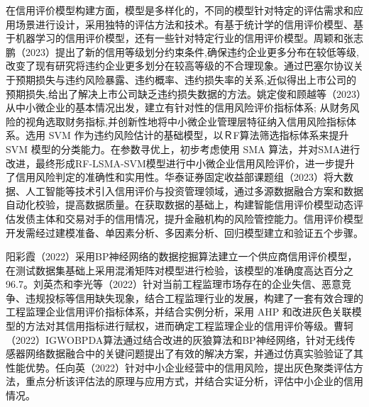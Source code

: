 在信用评价模型构建方面，模型是多样化的，不同的模型针对特定的评估需求和应用场景进行设计，采用独特的评估方法和技术。有基于统计学的信用评价模型、基于机器学习的信用评价模型，还有一些针对特定行业的信用评价模型。周颖和张志鹏（2023）提出了新的信用等级划分约束条件,确保违约企业更多分布在较低等级,改变了现有研究将违约企业更多划分在较高等级的不合理现象。通过巴塞尔协议关于预期损失与违约风险暴露、违约概率、违约损失率的关系,近似得出上市公司的预期损失,给出了解决上市公司缺乏违约损失数据的方法。姚定俊和顾越等（2023）从中小微企业的基本情况出发，建立有针对性的信用风险评价指标体系; 从财务风险的视角选取财务指标,并创新性地将中小微企业管理层特征纳入信用风险指标体系。选用 SVM 作为违约风险估计的基础模型，以ＲF算法筛选指标体系来提升 SVM 模型的分类能力。在参数寻优上，初步考虑使用 SMA 算法，并对SMA进行改进，最终形成RF-LSMA-SVM模型进行中小微企业信用风险评价，进一步提升了信用风险判定的准确性和实用性。华泰证券固定收益部课题组（2023）将大数据、人工智能等技术引入信用评价与投资管理领域，通过多源数据融合方案和数据自动化校验，提高数据质量。在获取数据的基础上，构建智能信用评价模型动态评估发债主体和交易对手的信用情况，提升金融机构的风险管控能力。信用评价模型开发需经过建模准备、单因素分析、多因素分析、回归模型建立和验证五个步骤。

阳彩霞（2022）采用BP神经网络的数据挖掘算法建立一个供应商信用评价模型，在测试数据集基础上采用混淆矩阵对模型进行检验，该模型的准确度高达百分之96.7。刘英杰和李光等（2022）针对当前工程监理市场存在的企业失信、恶意竞争、违规投标等信用缺失现象，结合工程监理行业的发展，构建了一套有效合理的工程监理企业信用评价指标体系，并结合实例分析，采用 AHP 和改进灰色关联模型的方法对其信用指标进行赋权，进而确定工程监理企业的信用评价等级。曹轲（2022）IGWOBPDA算法通过结合改进的灰狼算法和BP神经网络，针对无线传感器网络数据融合中的关键问题提出了有效的解决方案，并通过仿真实验验证了其性能优势。任向英（2022）针对中小企业经营中的信用风险，提出灰色聚类评估方法，重点分析该评估法的原理与应用方式，并结合实证分析，评估中小企业的信用情况。

